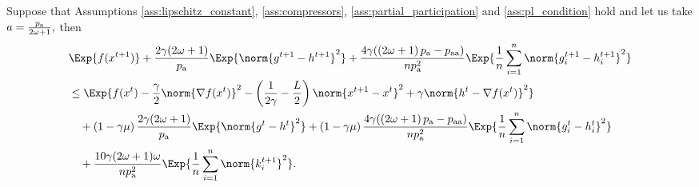 \documentclass{article}
\newcommand*{\probavailable}{\ensuremath{p_{\textnormal{a}}}}
\newcommand*{\probpairaa}{\ensuremath{p_{\textnormal{aa}}}}
\begin{document}
\begin{lemma}
  \label{lemma:main_lemma_pl}
  Suppose that Assumptions \ref{ass:lipschitz_constant}, \ref{ass:compressors}, \ref{ass:partial_participation} and \ref{ass:pl_condition} hold and let us take $a = \frac{\probavailable}{2 \omega + 1},$ then
  \begin{align*}
    &\Exp{f(x^{t + 1})} + \frac{2\gamma (2\omega + 1)}{\probavailable} \Exp{\norm{g^{t+1} - h^{t+1}}^2} + \frac{4 \gamma (\left(2 \omega + 1\right)\probavailable - \probpairaa)}{n \probavailable^2} \Exp{\frac{1}{n}\sum_{i=1}^n\norm{g^{t+1}_i - h^{t+1}_i}^2}\\
    &\leq \Exp{f(x^t) - \frac{\gamma}{2}\norm{\nabla f(x^t)}^2 - \left(\frac{1}{2\gamma} - \frac{L}{2}\right)
    \norm{x^{t+1} - x^t}^2 + \gamma \norm{h^{t} - \nabla f(x^t)}^2}\nonumber\\
    &\quad + \left(1 - \gamma \mu\right)\frac{2\gamma(2\omega + 1)}{\probavailable}\Exp{\norm{g^{t} - h^t}^2} + \left(1 - \gamma \mu\right)\frac{4 \gamma (\left(2 \omega + 1\right)\probavailable - \probpairaa)}{n \probavailable^2}\Exp{\frac{1}{n} \sum_{i=1}^n\norm{g^t_i - h^{t}_i}^2}\nonumber\\
    &\quad + \frac{10 \gamma (2 \omega + 1)\omega}{n \probavailable^2}\Exp{\frac{1}{n} \sum_{i=1}^n\norm{k^{t+1}_i}^2}.
  \end{align*}
\end{lemma}
\end{document}
